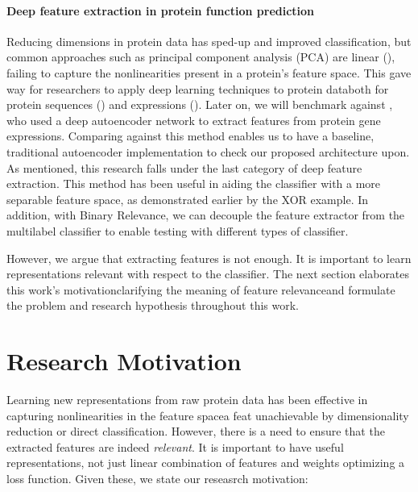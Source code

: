 \paragraph{Deep feature extraction in protein function prediction}
Reducing dimensions in protein data has sped-up and improved classification,
but common approaches such as principal component analysis (PCA) are linear
(\cite{bengio2013representation}), failing to capture the nonlinearities
present in a protein's feature space. This gave way for researchers to apply
deep learning techniques to protein data\textemdash both for protein
sequences (\cite{bhola2014machine,kulmanov2017deepgo, zou2017protein}) and
expressions (\cite{baldi2001bioinformatics, chicco2014deep}). Later on, we
will benchmark against \cite{chicco2014deep}, who used a deep autoencoder
network to extract features from protein gene expressions. Comparing against
this method enables us to have a baseline, traditional autoencoder
implementation to check our proposed architecture upon. As mentioned, this
research falls under the last category of deep feature extraction. This
method has been useful in aiding the classifier with a more separable feature
space, as demonstrated earlier by the XOR example. In addition, with Binary
Relevance, we can decouple the feature extractor from the multilabel
classifier to enable testing with different types of classifier.

\par However, we argue that extracting features is not enough. It is
important to learn representations relevant with respect to the classifier.
The next section elaborates this work's motivation\textemdash clarifying the
meaning of feature relevance\textemdash and formulate the problem and
research hypothesis throughout this work.

\section{Research Motivation}
\label{Motivation}

\par Learning new representations from raw protein data has been effective in
capturing nonlinearities in the feature space\textemdash a feat unachievable
by dimensionality reduction or direct classification. However, there is a
need to ensure that the extracted features are indeed \textit{relevant}. It
is important to have useful representations, not just linear combination of
features and weights optimizing a loss function. Given these, we state our
reseasrch motivation:


